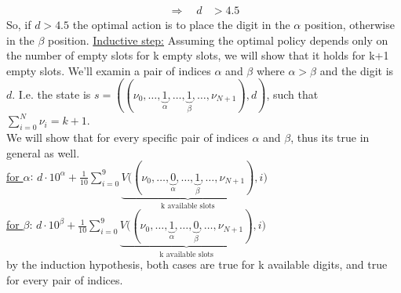 \documentclass{assignmeownt}
\begin{document}
\begin{enumerate}
\begin{equation}
\begin{aligned}
        \Rightarrow \quad d &> 4.5
    \end{aligned}
\end{equation}
\newline
So, if $d > 4.5$ the optimal action is to place the digit in the $\alpha$ position, otherwise in the $\beta$ position.
\newline
\underline{Inductive step:} Assuming the optimal policy depends only on the number of empty slots for k empty slots, we will show that it holds for k+1 empty slots. We'll examin a pair of indices $\alpha$ and $\beta$ where $\alpha > \beta$ and the digit is $d$. I.e. the state is $s=((\nu_0, \dots, \underbrace{1}_{{\alpha}}, \dots, \underbrace{1}_{{\beta}}, \dots, \nu_{N+1}), d)$, such that $\sum_{i=0}^{N} \nu_i = k+1$.
\\
We will show that for every specific pair of indices $\alpha$ and $\beta$, thus its true in general as well.
\\
\underline{for $\alpha$}: $
    d \cdot 10^{\alpha} + \frac{1}{10} \sum_{i=0}^{9} 
    \underbrace{V((\nu_0, \dots, \underbrace{0}_{\alpha}, \dots, \underbrace{1}_{\beta}, \dots, \nu_{N+1})}_{\text{k available slots}}, i) $
\\
\underline{for $\beta$}: $
    d \cdot 10^{\beta} + \frac{1}{10} \sum_{i=0}^{9} 
    \underbrace{V((\nu_0, \dots, \underbrace{1}_{\alpha}, \dots, \underbrace{0}_{\beta}, \dots, \nu_{N+1})}_{\text{k available slots}}, i) $
\\
by the induction hypothesis, both cases are true for k available digits, and true for every pair of indices. 


\end{enumerate}
\end{document}
